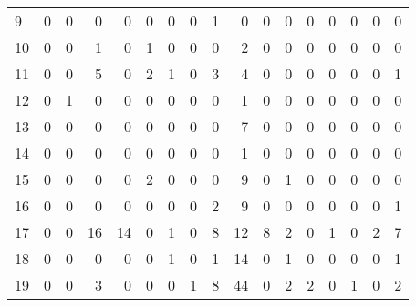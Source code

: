 \begin{tabular}{lrrrrrrrrrrrrrrrr}
9        &          0 &              0 &    0 &           0 &               0 &            0 &      0 &        1 &      0 &    0 &    0 &         0 &           0 &       0 &         0 &       0 \\
10       &          0 &              0 &    1 &           0 &               1 &            0 &      0 &        0 &      2 &    0 &    0 &         0 &           0 &       0 &         0 &       0 \\
11       &          0 &              0 &    5 &           0 &               2 &            1 &      0 &        3 &      4 &    0 &    0 &         0 &           0 &       0 &         0 &       1 \\
12       &          0 &              1 &    0 &           0 &               0 &            0 &      0 &        0 &      1 &    0 &    0 &         0 &           0 &       0 &         0 &       0 \\
13       &          0 &              0 &    0 &           0 &               0 &            0 &      0 &        0 &      7 &    0 &    0 &         0 &           0 &       0 &         0 &       0 \\
14       &          0 &              0 &    0 &           0 &               0 &            0 &      0 &        0 &      1 &    0 &    0 &         0 &           0 &       0 &         0 &       0 \\
15       &          0 &              0 &    0 &           0 &               2 &            0 &      0 &        0 &      9 &    0 &    1 &         0 &           0 &       0 &         0 &       0 \\
16       &          0 &              0 &    0 &           0 &               0 &            0 &      0 &        2 &      9 &    0 &    0 &         0 &           0 &       0 &         0 &       1 \\
17       &          0 &              0 &   16 &          14 &               0 &            1 &      0 &        8 &     12 &    8 &    2 &         0 &           1 &       0 &         2 &       7 \\
18       &          0 &              0 &    0 &           0 &               0 &            1 &      0 &        1 &     14 &    0 &    1 &         0 &           0 &       0 &         0 &       1 \\
19       &          0 &              0 &    3 &           0 &               0 &            0 &      1 &        8 &     44 &    0 &    2 &         2 &           0 &       1 &         0 &       2 \\
\bottomrule
\end{tabular}
